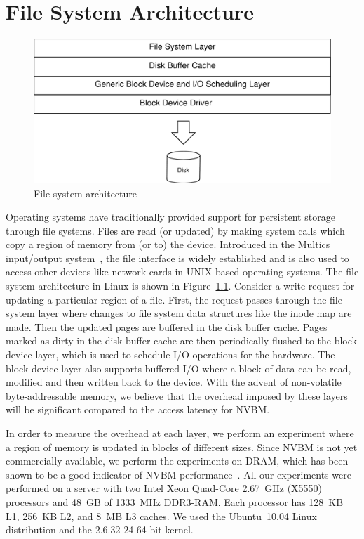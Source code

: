 \chapter{File System Architecture}
\label{sec:fs}

\begin{figure}[t]
\centerline{\includegraphics[width=0.7\columnwidth]{figs/block-fs-disk}}
\caption{File system architecture}
\label{fig:block-fs}
\end{figure}

Operating systems have traditionally provided support for persistent
storage through file systems. Files are read (or updated) by making
system calls which copy a region of memory from (or to) the
device. Introduced in the Multics input/output
system~\cite{Feiertag72}, the file interface is widely established and
is also used to access other devices like network cards in UNIX based
operating systems. The file system architecture in Linux is shown in
Figure~\ref{fig:block-fs}. Consider a write request for updating a
particular region of a file. First, the request passes through the
file system layer where changes to file system data structures like the
inode map are made. Then the updated pages are buffered in the disk
buffer cache. Pages marked as dirty in the disk buffer cache are then
periodically flushed to the block device layer, which is used to schedule
I/O operations for the hardware. The block device layer also supports
buffered I/O where a block of data can be read, modified and then
written back to the device. With the advent of non-volatile
byte-addressable memory, we believe that the overhead imposed by these
layers will be significant compared to the access latency for NVBM.

In order to measure the overhead at each layer, we perform an experiment where
a region of memory is updated in blocks of different sizes. Since NVBM is not
yet commercially available, we perform the experiments on DRAM, which has been
shown to be a good indicator of NVBM performance~\cite{Condit09}. All our
experiments were performed on a server with two Intel Xeon Quad-Core 2.67~GHz
(X5550) processors and 48~GB of 1333~MHz DDR3-RAM.  Each processor has 128~KB
L1, 256~KB L2, and 8~MB L3 caches. We used the Ubuntu~10.04 Linux distribution
and the 2.6.32-24 64-bit kernel.

